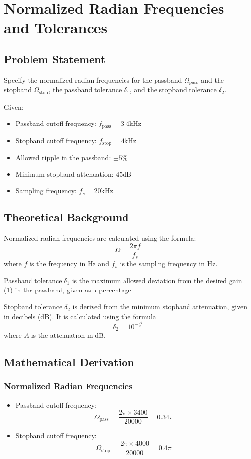 \item[(a)]
\section{Normalized Radian Frequencies and Tolerances}

\subsection*{Problem Statement}
Specify the normalized radian frequencies for the passband \( \Omega_{\text{pass}} \) and the stopband \( \Omega_{\text{stop}} \), the passband tolerance \( \delta_{1} \), and the stopband tolerance \( \delta_{2} \).

Given:
\begin{itemize}
    \item Passband cutoff frequency: \( f_{\text{pass}} = 3.4 \text{kHz} \)
    \item Stopband cutoff frequency: \( f_{\text{stop}} = 4 \text{kHz} \)
    \item Allowed ripple in the passband: \( \pm 5\% \)
    \item Minimum stopband attenuation: \( 45 \text{dB} \)
    \item Sampling frequency: \( f_s = 20 \text{kHz} \)
\end{itemize}

\subsection*{Theoretical Background}
Normalized radian frequencies are calculated using the formula:
\[ \Omega = \frac{2\pi f}{f_s} \]
where \( f \) is the frequency in Hz and \( f_s \) is the sampling frequency in Hz.

Passband tolerance \( \delta_1 \) is the maximum allowed deviation from the desired gain (1) in the passband, given as a percentage.

Stopband tolerance \( \delta_2 \) is derived from the minimum stopband attenuation, given in decibels (dB). It is calculated using the formula:
\[ \delta_2 = 10^{-\frac{A}{20}} \]
where \( A \) is the attenuation in dB.

\subsection*{Mathematical Derivation}

\subsubsection*{Normalized Radian Frequencies}
\begin{itemize}
    \item Passband cutoff frequency:
    \[
    \Omega_{\text{pass}} = \frac{2\pi \times 3400}{20000} = 0.34\pi
    \]
    \item Stopband cutoff frequency:
    \[
    \Omega_{\text{stop}} = \frac{2\pi \times 4000}{20000} = 0.4\pi
    \]
\end{itemize}

